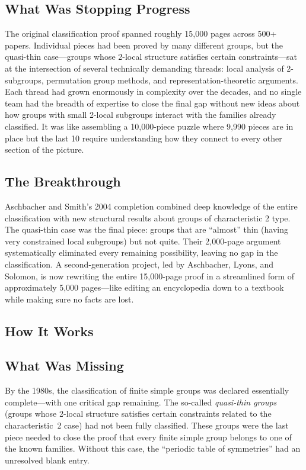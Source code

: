\subsection{What Was Stopping Progress}
The original classification proof spanned roughly 15,000 pages across 500+ papers. Individual pieces had been proved by many different groups, but the quasi-thin case---groups whose 2-local structure satisfies certain constraints---sat at the intersection of several technically demanding threads: local analysis of 2-subgroups, permutation group methods, and representation-theoretic arguments. Each thread had grown enormously in complexity over the decades, and no single team had the breadth of expertise to close the final gap without new ideas about how groups with small 2-local subgroups interact with the families already classified. It was like assembling a 10,000-piece puzzle where 9,990 pieces are in place but the last 10 require understanding how they connect to every other section of the picture.

\subsection{The Breakthrough}
Aschbacher and Smith's 2004 completion combined deep knowledge of the entire classification with new structural results about groups of characteristic 2 type. The quasi-thin case was the final piece: groups that are ``almost'' thin (having very constrained local subgroups) but not quite. Their 2,000-page argument systematically eliminated every remaining possibility, leaving no gap in the classification. A second-generation project, led by Aschbacher, Lyons, and Solomon, is now rewriting the entire 15,000-page proof in a streamlined form of approximately 5,000 pages---like editing an encyclopedia down to a textbook while making sure no facts are lost.

\subsection{How It Works}

\subsection{What Was Missing}
By the 1980s, the classification of finite simple groups was declared essentially complete---with one critical gap remaining. The so-called \emph{quasi-thin groups} (groups whose 2-local structure satisfies certain constraints related to the characteristic~2 case) had not been fully classified. These groups were the last piece needed to close the proof that every finite simple group belongs to one of the known families. Without this case, the ``periodic table of symmetries'' had an unresolved blank entry.


